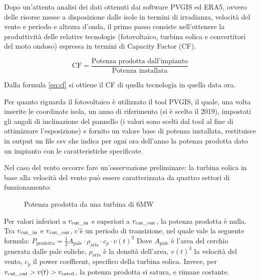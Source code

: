 \documentclass[fleqn,11pt]{SelfArx} %
\begin{document}
Dopo un'attenta analisi dei dati ottenuti dai software PVGIS ed ERA5, ovvero delle risorse messe a
disposizione dalle isole in termini di irradianza, velocità del vento e periodo e altezza d'onda, il
primo passo consiste nell'ottenere la produttività delle relative tecnologie (fotovoltaico, turbina
eolica e convertitori del moto ondoso) espressa in termini di Capacity Factor (CF).

\begin{equation}
	\text{CF} = \frac{\text{Potenza prodotta dall'impianto}}{\text{Potenza installata}}
	\label{eq:cf}
\end{equation}

Dalla formula \ref{eq:cf} si ottiene il CF di quella tecnologia in quella data ora. 

Per quanto riguarda il fotovoltaico è utilizzato il tool PVGIS, il quale, una volta inserite le
coordinate isola, un anno di riferimento (si è scelto il 2019), impostati gli angoli di inclinazione del
pannello (i valori sono scelti dal tool al fine di ottimizzare l'esposizione) e fornito un valore base di
potenza installata, restituisce in output un file csv che indica per ogni ora dell'anno la potenza
prodotta dato un impianto con le caratteristiche specificate.

Nel caso del vento occorre fare un'osservazione preliminare:
la turbina eolica in base alla velocità del vento può essere caratterizzata da quattro settori di
funzionamento: 
\begin{figure}[H]\centering
	\caption{Potenza prodotta da una turbina di $6 \text{MW}$}
	\label{fig:results}
\end{figure}

Per valori inferiori a \(v_{\text{cut\_in}}\) e superiori a \(v_{\text{cut\_out}}\), la potenza prodotta è nulla. 
Tra \(v_{\text{cut\_in}}\) e \(v_{\text{cut\_out}}\), c'è un periodo di transizione, nel quale vale la seguente formula: 
\(P_{\text{prodotta}} = \frac{1}{2} A_{\text{pale}} \cdot \rho_{\text{aria}} \cdot c_p \cdot v(t)^3 \) 
Dove \(A_{\text{pale}}\) è l'area del cerchio generata dalle pale eoliche, \(\rho_{\text{aria}}\) è la densità dell'area, \(v(t)^3\) la velocità del vento, \(c_p\) il power coefficent, specifico della turbina eolica. 
Invece, per \(v_{\text{cut\_out}} > v(t) > v_{\text{rated}}\), la potenza prodotta si satura, e rimane costante. 
\end{document}
